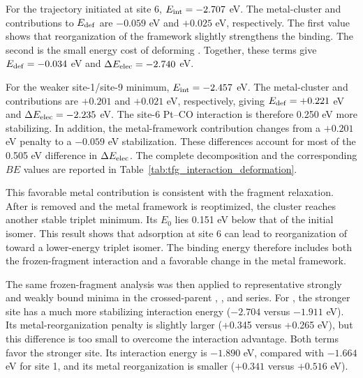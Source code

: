 For the trajectory initiated at site 6, \(E_{\rm int}=-2.707\) eV. The
metal-cluster and  contributions to \(E_{\rm def}\) are \(-0.059\) eV
and \(+0.025\) eV, respectively. The first value shows that reorganization of
the  framework slightly strengthens the binding. The second is the
small energy cost of deforming . Together, these terms give
\(E_{\rm def}=-0.034\) eV and \(\Delta E_{\rm elec}=-2.740\) eV.

For the weaker site-1/site-9 minimum, \(E_{\rm int}=-2.457\) eV. The
metal-cluster and  contributions are \(+0.201\) and \(+0.021\) eV,
respectively, giving \(E_{\rm def}=+0.221\) eV and
\(\Delta E_{\rm elec}=-2.235\) eV. The site-6 Pt--CO interaction is therefore
0.250 eV more stabilizing. In addition, the metal-framework contribution
changes from a \(+0.201\) eV penalty to a \(-0.059\) eV stabilization. These
differences account for most of the 0.505 eV difference in
\(\Delta E_{\rm elec}\). The complete decomposition and the corresponding
\(BE\) values are reported in
Table~\ref{tab:tfg_interaction_deformation}.

{This favorable metal contribution is consistent with the fragment
relaxation. After  is removed and the metal framework is reoptimized,
the cluster reaches another stable triplet minimum. Its $E_0$ lies 0.151 eV
below that of the initial  isomer. This result shows that adsorption
at site 6 can lead to reorganization of  toward a lower-energy
triplet isomer. The binding energy therefore includes both the
frozen-fragment interaction and a favorable change in the metal framework.}

{The same frozen-fragment analysis was then applied to representative strongly
and weakly bound minima in the crossed-parent , ,
and  series. For , the stronger site has a much more
stabilizing interaction energy ($-2.704$ versus $-1.911$ eV). Its
metal-reorganization penalty is slightly larger (+0.345 versus +0.265 eV),
but this difference is too small to overcome the interaction advantage. Both
terms favor the stronger  site. Its interaction energy is
$-1.890$ eV, compared with $-1.664$ eV for site 1, and its metal
reorganization is smaller ($+0.341$ versus $+0.516$ eV).}

